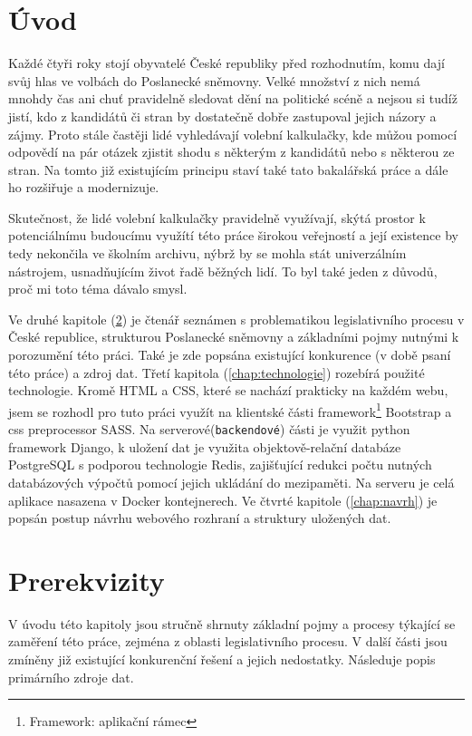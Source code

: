 
\chapter{Úvod}
Každé čtyři roky stojí obyvatelé České republiky před rozhodnutím, komu dají svůj hlas ve volbách do Poslanecké sněmovny. Velké množství z nich nemá mnohdy čas ani chuť pravidelně sledovat dění na politické scéně a nejsou si tudíž jistí, kdo z kandidátů či stran by dostatečně dobře zastupoval jejich názory a zájmy. Proto stále častěji lidé vyhledávají volební kalkulačky, kde můžou pomocí odpovědí na pár otázek zjistit shodu s některým z kandidátů nebo s některou ze stran. Na tomto již existujícím principu staví také tato bakalářská práce a dále ho rozšiřuje a modernizuje. 
\par Skutečnost, že lidé volební kalkulačky pravidelně využívají, skýtá prostor k potenciálnímu budoucímu využítí této práce širokou veřejností a její existence by tedy nekončila ve školním archivu, nýbrž by se mohla stát univerzálním nástrojem, usnadňujícím život řadě běžných lidí. To byl také jeden z důvodů, proč mi toto téma dávalo smysl.
\par Ve druhé kapitole (\ref{chap:Prerekvizity}) je čtenář seznámen s problematikou legislativního procesu v České republice, strukturou Poslanecké sněmovny a základními pojmy nutnými k porozumění této práci. Také je zde popsána existující konkurence (v době psaní této práce) a zdroj dat. Třetí kapitola (\ref{chap:technologie}) rozebírá použité technologie. Kromě HTML a CSS, které se nachází prakticky na každém webu, jsem se rozhodl pro tuto práci využít na klientské části framework\footnote{Framework: aplikační rámec} Bootstrap a css preprocessor SASS. Na serverové(\texttt{backendové}) části je využit python framework Django, k uložení dat je využita objektově-relační databáze PostgreSQL s podporou technologie Redis, zajišťující redukci počtu nutných databázových výpočtů pomocí jejich ukládání do mezipaměti. Na serveru je celá aplikace nasazena v Docker kontejnerech.  Ve čtvrté kapitole (\ref{chap:navrh}) je popsán postup návrhu webového rozhraní a struktury uložených dat.\\










\chapter{Prerekvizity}
\label{chap:Prerekvizity}
V úvodu této kapitoly jsou stručně shrnuty základní pojmy a procesy týkající se zaměření této práce, zejména z oblasti legislativního procesu. V další části jsou zmíněny již existující konkurenční řešení a jejich nedostatky. Následuje popis primárního zdroje dat.


